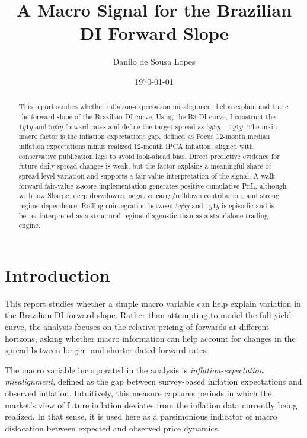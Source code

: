 \documentclass[11pt]{article}
\title{A Macro Signal for the Brazilian DI Forward Slope}
\author{Danilo de Sousa Lopes}
\date{\today}
\begin{document}
	
	\maketitle
	
	\begin{abstract}
		This report studies whether inflation-expectation misalignment helps explain and trade the forward slope of the Brazilian DI curve. Using the B3 DI curve, I construct the \(1y1y\) and \(5y5y\) forward rates and define the target spread as \(5y5y - 1y1y\). The main macro factor is the inflation expectations gap, defined as Focus 12-month median inflation expectations minus realized 12-month IPCA inflation, aligned with conservative publication lags to avoid look-ahead bias. Direct predictive evidence for future daily spread changes is weak, but the factor explains a meaningful share of spread-level variation and supports a fair-value interpretation of the signal. A walk-forward fair-value z-score implementation generates positive cumulative PnL, although with low Sharpe, deep drawdowns, negative carry/rolldown contribution, and strong regime dependence. Rolling cointegration between \(5y5y\) and \(1y1y\) is episodic and is better interpreted as a structural regime diagnostic than as a standalone trading engine.
	\end{abstract}
	

	
	
	\section{Introduction}
	
	This report studies whether a simple macro variable can help explain variation in the Brazilian DI forward slope. Rather than attempting to model the full yield curve, the analysis focuses on the relative pricing of forwards at different horizons, asking whether macro information can help account for changes in the spread between longer- and shorter-dated forward rates.
	
	The macro variable incorporated in the analysis is \emph{inflation-expectation misalignment}, defined as the gap between survey-based inflation expectations and observed inflation. Intuitively, this measure captures periods in which the market's view of future inflation deviates from the inflation data currently being realized. In that sense, it is used here as a parsimonious indicator of macro dislocation between expected and observed price dynamics.
	
\end{document}

